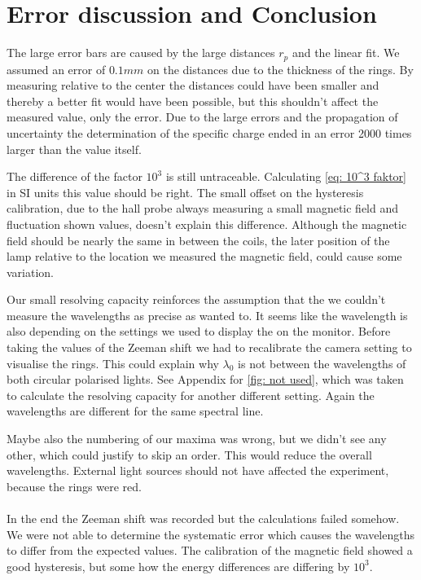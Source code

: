 \documentclass[]{article}
\begin{document}
\newpage
\section{Error discussion and Conclusion}
The large error bars are caused by the large distances $r_p$ and the linear fit. We assumed an error of $0.1mm$ on the distances due to the thickness of the rings. By measuring relative to the center the distances could have been smaller and thereby a better fit would have been possible, but this shouldn't affect the measured value, only the error. Due to the large errors and the propagation of uncertainty the determination of the specific charge ended in an error 2000 times larger than the value itself.

The difference of the factor $10^3$ is still untraceable. Calculating \autoref{eq: 10^3 faktor} in SI units this value should be right. The small offset on the hysteresis calibration, due to the hall probe always measuring a small magnetic field and fluctuation shown values, doesn't explain this difference. Although the magnetic field should be nearly the same in between the coils, the later position of the lamp relative to the location we measured the magnetic field, could cause some variation.

Our small resolving capacity reinforces the assumption that the we couldn't measure the wavelengths as precise as wanted to. It seems like the wavelength is also depending on the settings we used to display the on the monitor. Before taking the values of the Zeeman shift we had to recalibrate the camera setting to visualise the rings. This could explain why $\lambda_0$ is not between the wavelengths of both circular polarised lights. See Appendix for \autoref{fig: not used}, which was taken to calculate the resolving capacity for another different setting. Again the wavelengths are different for the same spectral line.

Maybe also the numbering of our maxima was wrong, but we didn't see any other, which could justify to skip an order. This would reduce the overall wavelengths. External light sources should not have affected the experiment, because the rings were red.
\\ \\
In the end the Zeeman shift was recorded but the calculations failed somehow. We were not able to determine the systematic error which causes the wavelengths to differ from the expected values. The calibration of the magnetic field showed a good hysteresis, but some how the energy differences are differing by $10^3$. 
\end{document}
